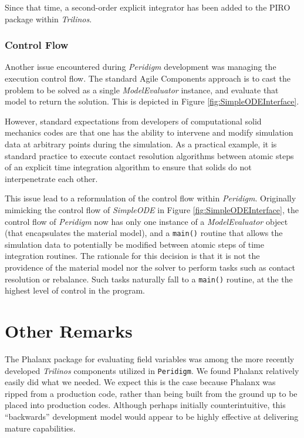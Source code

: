 \documentclass[10pt]{article}
\theoremstyle{plain}
\theoremstyle{definition}
\theoremstyle{remark}
\numberwithin{equation}{section}
\begin{document}
Since that time, a second-order explicit integrator has been added to the PIRO package within \emph{Trilinos}.

\subsubsection{Control Flow}

Another issue encountered during \emph{Peridigm} development was managing the execution control flow. The standard Agile Components approach is to cast the problem to be solved as a single \emph{ModelEvaluator} instance, and evaluate that model to return the solution. This is depicted in Figure \ref{fig:SimpleODEInterface}.

However, standard expectations from developers of computational solid mechanics codes are that one has the ability to intervene and modify simulation data at arbitrary points during the simulation. As a practical example, it is standard practice to execute contact resolution algorithms between atomic steps of an explicit time integration algorithm to ensure that solids do not interpenetrate each other.

This issue lead to a reformulation of the control flow within \emph{Peridigm}. Originally mimicking the control flow of \emph{SimpleODE} in Figure \ref{fig:SimpleODEInterface}, the control flow of \emph{Peridigm} now has only one instance of a \emph{ModelEvaluator} object (that encapsulates the material model), and a \verb"main()" routine that allows the simulation data to potentially be modified between atomic steps of time integration routines. The rationale for this decision is that it is not the providence of the material model nor the solver to perform tasks such as contact resolution or rebalance. Such tasks naturally fall to a \verb"main()" routine, at the the highest level of control in the program.

\section{Other Remarks}

The Phalanx package for evaluating field variables was among the more recently developed \emph{Trilinos} components utilized in \verb"Peridigm". We found Phalanx relatively easily did what we needed. We expect this is the case because Phalanx was ripped from a production code, rather than being built from the ground up to be placed into production codes. Although perhaps initially counterintuitive, this ``backwards'' development model would appear to be highly effective at delivering mature capabilities.
\end{document}
